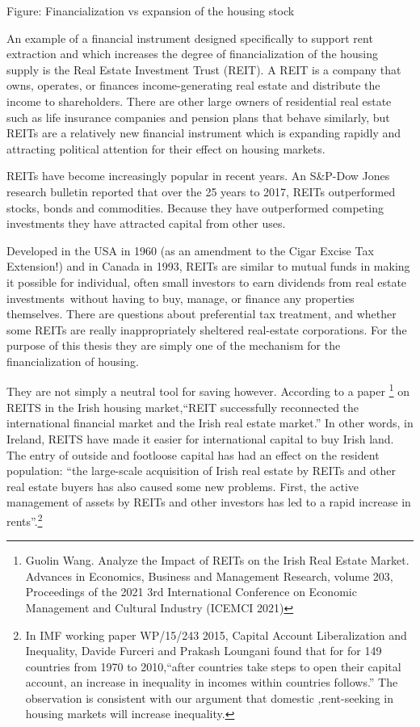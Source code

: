 Figure: Financialization vs expansion of the housing stock 


An example of a financial instrument designed specifically to support rent extraction and which  increases the degree of financialization of the housing supply is the  Real Estate Investment Trust (REIT).  A REIT is a company that owns, operates, or finances income-generating real estate and distribute the income to shareholders. There are other large owners of residential real estate such as life insurance companies and pension plans that behave similarly, but REITs are a relatively new financial instrument which is  expanding rapidly and attracting political attention for their effect on housing markets.  %

REITs have become increasingly popular in recent years.  An S\&P-Dow Jones research bulletin reported that over the  25 years to 2017, REITs outperformed stocks, bonds and commodities. Because they have outperformed competing investments they have attracted  capital from other uses.

Developed in the USA  in 1960 (as an amendment to the Cigar Excise Tax Extension!) and in Canada in 1993, REITs are similar to mutual funds in making it possible for individual, often small investors to earn dividends from real estate investments without having to buy, manage, or finance any properties themselves. There are questions about preferential tax treatment, and whether some REITs are really inappropriately sheltered real-estate corporations.  For the purpose of this thesis they are simply one of the mechanism for the financialization of housing.

They are not simply a neutral tool for saving however. According to a paper \cite{wangAnalyzeImpactREITs2021}\footnote{ Guolin Wang. Analyze the Impact of REITs on the Irish Real Estate Market. Advances in Economics, Business and Management Research, volume 203, Proceedings of the 2021 3rd International Conference on Economic Management and Cultural Industry (ICEMCI 2021)} on REITS in the Irish housing market,``REIT successfully reconnected the international financial market and the Irish real estate market.'' In other words, in Ireland, REITS have made it easier for international capital to buy Irish land. The entry of outside and footloose capital has had an effect on the resident population:  ``the large-scale acquisition of Irish real estate by REITs and other real estate buyers has also caused some new problems. First, the active management of assets by REITs and other investors has led to a rapid increase in rents''.\footnote{In IMF working paper WP/15/243 2015, Capital Account Liberalization and Inequality, Davide Furceri and Prakash Loungani found that for for 149 countries from 1970 to 2010,``after countries take steps to open their capital account, an increase in inequality in incomes within countries follows.'' The observation is consistent with our argument  that domestic ,rent-seeking in housing markets will increase inequality.}   \cite{furceriCapitalAccountLiberalization2015}

